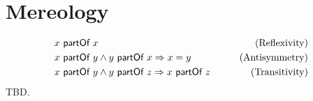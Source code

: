 \section{Mereology}
\cite{DBLP:journals/dke/Varzi96}
\begin{align}
&x ~\textsf{partOf}~ x 
&\qquad \text{(Reflexivity)}
\\&x ~\textsf{partOf}~ y \wedge y ~\textsf{partOf}~ x \Rightarrow x = y
&\qquad \text{(Antisymmetry)}
\\&x ~\textsf{partOf}~ y \wedge y ~\textsf{partOf}~ z \Rightarrow x ~\textsf{partOf}~ z
&\qquad \text{(Transitivity)}
\end{align}
TBD.